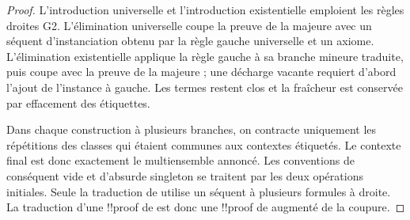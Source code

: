 \documentclass[../../../include/open-logic-section]{subfiles}
\begin{document}
\begin{proof}
L'introduction universelle et l'introduction
existentielle emploient les règles droites G2.
L'élimination universelle coupe la preuve de la
majeure avec un séquent d'instanciation obtenu
par la règle gauche universelle et un axiome.
L'élimination existentielle applique la règle
gauche à sa branche mineure traduite, puis
coupe avec la preuve de la majeure ; une décharge
vacante requiert d'abord l'ajout de l'instance
à gauche. Les termes restent clos et la fraîcheur
est conservée par effacement des étiquettes.

Dans chaque construction à plusieurs branches,
on contracte uniquement les répétitions des classes
qui étaient communes aux contextes étiquetés.
Le contexte final est donc exactement le multiensemble
annoncé. Les conventions de conséquent vide et
d'absurde singleton se traitent par les deux
opérations initiales. Seule la traduction de
\FalseCl{} utilise un séquent à plusieurs formules
à droite. La traduction d'une !!{proof} de
 est donc une !!{proof} de 
augmenté de la coupure.
\end{proof}
\end{document}
